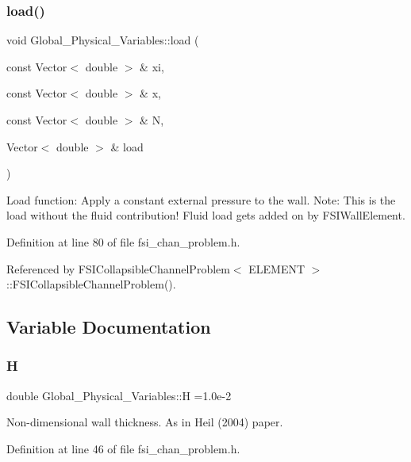 \subsubsection{\texorpdfstring{load()}{load()}}
{\footnotesize\ttfamily void Global\+\_\+\+Physical\+\_\+\+Variables\+::load (\begin{DoxyParamCaption}\item[{const Vector$<$ double $>$ \&}]{xi,  }\item[{const Vector$<$ double $>$ \&}]{x,  }\item[{const Vector$<$ double $>$ \&}]{N,  }\item[{Vector$<$ double $>$ \&}]{load }\end{DoxyParamCaption})}



Load function\+: Apply a constant external pressure to the wall. Note\+: This is the load without the fluid contribution! Fluid load gets added on by F\+S\+I\+Wall\+Element. 



Definition at line 80 of file fsi\+\_\+chan\+\_\+problem.\+h.



Referenced by F\+S\+I\+Collapsible\+Channel\+Problem$<$ E\+L\+E\+M\+E\+N\+T $>$\+::\+F\+S\+I\+Collapsible\+Channel\+Problem().



\subsection{Variable Documentation}
\mbox{\label{namespaceGlobal__Physical__Variables_af6e07423e22c0991084d9a2f43727805}} 
\subsubsection{\texorpdfstring{H}{H}}
{\footnotesize\ttfamily double Global\+\_\+\+Physical\+\_\+\+Variables\+::H =1.\+0e-\/2}



Non-\/dimensional wall thickness. As in Heil (2004) paper. 



Definition at line 46 of file fsi\+\_\+chan\+\_\+problem.\+h.



